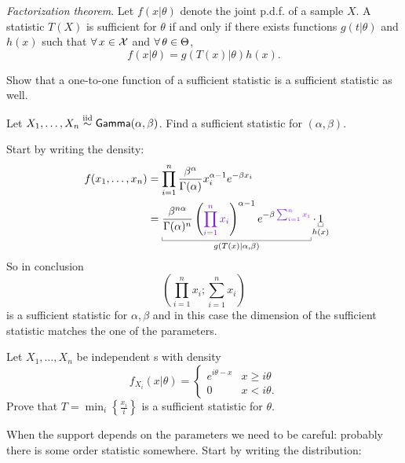 \begin{revise}
\begin{enumerate}
	\end{enumerate}
	\begin{theorem}
		\emph{Factorization theorem}. Let $f(x|\theta)$ denote the joint p.d.f. of a sample $X$. A statistic $T(X)$ is sufficient for $\theta$ if and only if there exists functions $g(t|\theta)$ and $h(x)$ such that $\forall\, x\in\mathcal{X}$ and $\forall\,\theta\in\Theta$,
		\begin{equation*}
			f(x|\theta)=g(T(x)|\theta)h(x).
		\end{equation*}
	\end{theorem}
	\begin{homework}
		Show that a one-to-one function of a sufficient statistic is a sufficient statistic as well.
	\end{homework}
\end{revise}
\begin{exercise}
	Let $X_{1},\ldots,X_{n}\stackrel{\mathrm{iid}}{\sim}\mathsf{Gamma}(\alpha,\beta)$. Find a sufficient statistic for $(\alpha,\beta)$.
\end{exercise}
Start by writing the density:
\begin{align*}
	f(x_{1},\ldots,x_{n})&=\prod_{i=1}^{n}\frac{\beta^{\alpha}}{\Gamma(\alpha)}x_{i}^{\alpha-1}e^{-\beta x_{i}}\\
	&=\ubracketthin{\frac{\beta^{n\alpha}}{\Gamma(\alpha)^{n}}\left(\mathcolor{Purple3}{\prod_{i=1}^{n}x_{i}}\right)^{\alpha-1}e^{-\beta\mathcolor{Purple3}{\sum_{i=1}^{n}x_{i}}}}_{g(T(x)|\alpha,\beta)}\cdot \ubracketthin{1}_{\mathclap{h(x)}}
\end{align*}
So in conclusion 
\begin{equation*}
	\left(\prod_{i=1}^{n}x_{i};\sum_{i=1}^{n}x_{i}\right)
\end{equation*}
is a sufficient statistic for $\alpha,\beta$ and in this case the dimension of the sufficient statistic matches the one of the parameters.
\begin{exercise}
	Let $X_{1},\ldots,X_{n}$ be independent \rv s with density
	\begin{equation*}
		f_{X_{i}}(x|\theta)=\begin{cases}
			e^{i\theta-x}&x\geq i\theta\\
			0&x<i\theta.
		\end{cases}
	\end{equation*}
	Prove that $T=\min_{i}\left\{\frac{x_{i}}{i}\right\}$ is a sufficient statistic for $\theta$.
\end{exercise}
When the support  depends on the parameters we need to be careful: probably there is some order statistic somewhere. Start by writing the distribution:
